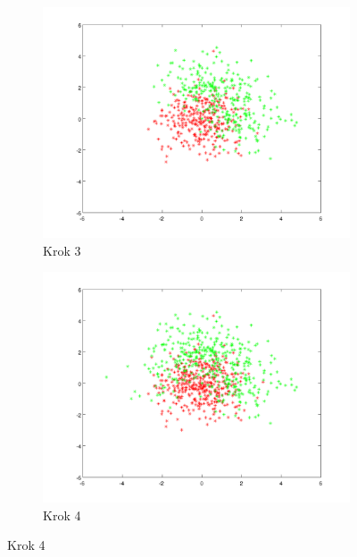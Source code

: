 \documentclass[10pt,a4paper]{article}
\begin{document}
\begin{figure}[H]
   \begin{subfigure}[b]{0.4\textwidth}
    \includegraphics[width=\textwidth]{dataGen_step2.png}
    \caption{Krok 3}
  \end{subfigure}
  \hfill
  \begin{subfigure}[b]{0.4\textwidth}
    \includegraphics[width=\textwidth]{dataGen_step3.png}
    \caption{Krok 4}
  \end{subfigure}
  

\end{figure}
\end{document}
